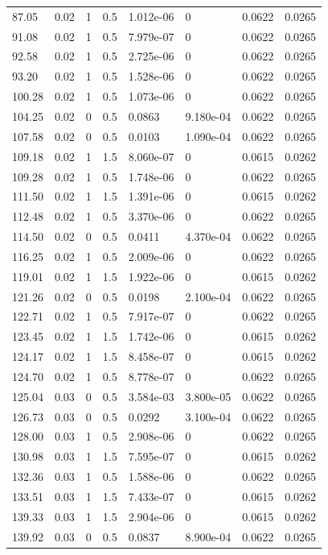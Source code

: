 \documentclass[preview]{standalone}
\begin{document}
{{\begin{tabular}{L{1.2cm}C{1.2cm} C{0.3cm}C{0.5cm} C{1.4cm}C{1.4cm} C{1.4cm}C{1.4cm}}
  87.05  &  0.02  & 1     & 0.5 &  1.012e-06  & 0  & 0.0622 &  0.0265   \\ 
  91.08  &  0.02  & 1     & 0.5 &  7.979e-07  & 0  & 0.0622 &  0.0265   \\ 
  92.58  &  0.02  & 1     & 0.5 &  2.725e-06  & 0  & 0.0622 &  0.0265   \\ 
  93.20  &  0.02  & 1     & 0.5 &  1.528e-06  & 0  & 0.0622 &  0.0265   \\ 
  100.28  &  0.02  & 1     & 0.5 &  1.073e-06  & 0  & 0.0622 &  0.0265   \\ 
  104.25  &  0.02  & 0     & 0.5 &  0.0863  & 9.180e-04  & 0.0622 &  0.0265   \\ 
  107.58  &  0.02  & 0     & 0.5 &  0.0103  & 1.090e-04  & 0.0622 &  0.0265   \\ 
  109.18  &  0.02  & 1     & 1.5 &  8.060e-07  & 0  & 0.0615 &  0.0262   \\ 
  109.28  &  0.02  & 1     & 0.5 &  1.748e-06  & 0  & 0.0622 &  0.0265   \\ 
  111.50  &  0.02  & 1     & 1.5 &  1.391e-06  & 0  & 0.0615 &  0.0262   \\ 
  112.48  &  0.02  & 1     & 0.5 &  3.370e-06  & 0  & 0.0622 &  0.0265   \\ 
  114.50  &  0.02  & 0     & 0.5 &  0.0411  & 4.370e-04  & 0.0622 &  0.0265   \\ 
  116.25  &  0.02  & 1     & 0.5 &  2.009e-06  & 0  & 0.0622 &  0.0265   \\ 
  119.01  &  0.02  & 1     & 1.5 &  1.922e-06  & 0  & 0.0615 &  0.0262   \\ 
  121.26  &  0.02  & 0     & 0.5 &  0.0198  & 2.100e-04  & 0.0622 &  0.0265   \\ 
  122.71  &  0.02  & 1     & 0.5 &  7.917e-07  & 0  & 0.0622 &  0.0265   \\ 
  123.45  &  0.02  & 1     & 1.5 &  1.742e-06  & 0  & 0.0615 &  0.0262   \\ 
  124.17  &  0.02  & 1     & 1.5 &  8.458e-07  & 0  & 0.0615 &  0.0262   \\ 
  124.70  &  0.02  & 1     & 0.5 &  8.778e-07  & 0  & 0.0622 &  0.0265   \\ 
  125.04  &  0.03  & 0     & 0.5 &  3.584e-03  & 3.800e-05  & 0.0622 &  0.0265   \\ 
  126.73  &  0.03  & 0     & 0.5 &  0.0292  & 3.100e-04  & 0.0622 &  0.0265   \\ 
  128.00  &  0.03  & 1     & 0.5 &  2.908e-06  & 0  & 0.0622 &  0.0265   \\ 
  130.98  &  0.03  & 1     & 1.5 &  7.595e-07  & 0  & 0.0615 &  0.0262   \\ 
  132.36  &  0.03  & 1     & 0.5 &  1.588e-06  & 0  & 0.0622 &  0.0265   \\ 
  133.51  &  0.03  & 1     & 1.5 &  7.433e-07  & 0  & 0.0615 &  0.0262   \\ 
  139.33  &  0.03  & 1     & 1.5 &  2.904e-06  & 0  & 0.0615 &  0.0262   \\ 
  139.92  &  0.03  & 0     & 0.5 &  0.0837  & 8.900e-04  & 0.0622 &  0.0265   \\ 
\hline 
\end{tabular} 

}}
\end{document}
